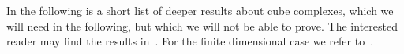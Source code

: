 


In the following is a short list of deeper results about cube complexes, which we will need in the following, but which we will not be able to prove. The interested reader may find the results in~\cite[Appendices A, B]{MR3029427}. For the finite dimensional case we refer to~\cite[Sec. I.7, II.5]{MR1744486}.

